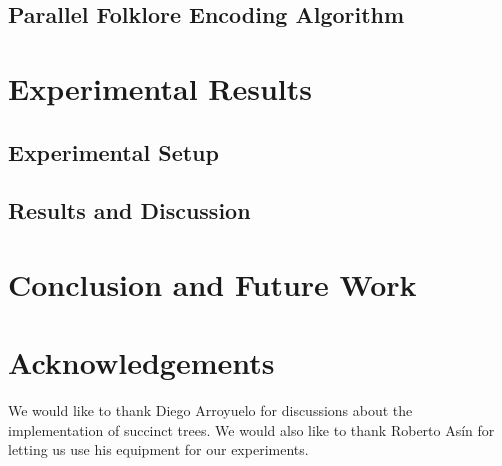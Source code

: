 \documentclass{sig-alternate}
\begin{document}
\subsection{Parallel Folklore Encoding Algorithm}
\label{subsec:parenthesesAlgorithm}


\section{Experimental Results}
\label{sec:exps}


\subsection{Experimental Setup}
\label{subsec:experimentalSetup}


\subsection{Results and Discussion}
\label{subsec:resultsDiscussion}



\section{Conclusion and Future Work}
\label{sec:conclusion}


\section*{Acknowledgements}

We would like to thank Diego Arroyuelo for discussions about the implementation
of succinct trees.
We would also like to thank Roberto As\'{i}n for letting us use his equipment
for our experiments.


%

%
%
\end{document}
